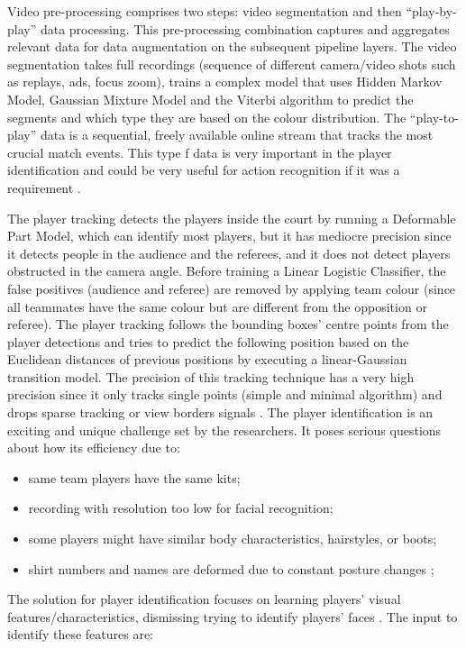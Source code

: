 \documentclass[
    11pt,
    oneside
]{report}
\begin{document}
Video pre-processing comprises two steps: video segmentation and then ``play-by-play'' data processing. This pre-processing combination captures and aggregates relevant data for data augmentation on the subsequent pipeline layers. The video segmentation takes full recordings (sequence of different camera/video shots such as replays, ads, focus zoom), trains a complex model that uses Hidden Markov Model, Gaussian Mixture Model and the Viterbi algorithm to predict the segments and which type they are based on the colour distribution. The ``play-to-play'' data is a sequential, freely available online stream that tracks the most crucial match events. This type f data is very important in the player identification and could be very useful for action recognition if it was a requirement \cite{learn_track_id}.

The player tracking detects the players inside the court by running a Deformable Part Model, which can identify most players, but it has mediocre precision since it detects people in the audience and the referees, and it does not detect players obstructed in the camera angle. Before training a Linear Logistic Classifier, the false positives (audience and referee) are removed by applying team colour (since all teammates have the same colour but are different from the opposition or referee). The player tracking follows the bounding boxes' centre points from the player detections and tries to predict the following position based on the Euclidean distances of previous positions by executing a linear-Gaussian transition model. The precision of this tracking technique has a very high precision since it only tracks single points (simple and minimal algorithm) and drops sparse tracking or view borders signals \cite{learn_track_id}.
The player identification is an exciting and unique challenge set by the researchers. It poses serious questions about how its efficiency due to:

\begin{itemize}
    \item same team players have the same kits;
    \item recording with resolution too low for facial recognition;
    \item some players might have similar body characteristics, hairstyles, or boots;
    \item shirt numbers and names are deformed due to constant posture changes \cite{learn_track_id};
\end{itemize}


The solution for player identification focuses on learning players' visual features/characteristics, dismissing trying to identify players' faces \cite{learn_track_id}. The input to identify these features are:
\end{document}
